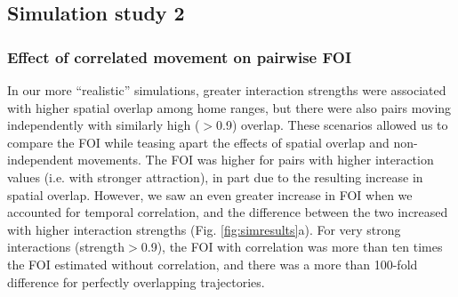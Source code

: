\documentclass[letterpaper]{article}
\begin{document}
\subsection*{Simulation study 2}

\subsubsection*{Effect of correlated movement on pairwise FOI}

In our more ``realistic'' simulations, greater interaction strengths were associated with higher spatial overlap among home ranges, but there were also pairs moving independently with similarly high  ($>$0.9) overlap. 
These scenarios allowed us to compare the FOI while teasing apart the effects of spatial overlap and non-independent movements. 
The FOI was higher for pairs with higher interaction values (i.e. with stronger attraction), in part due to the resulting increase in spatial overlap. 
However, we saw an even greater increase in FOI when we accounted for temporal correlation, and the difference between the two increased with higher interaction strengths (Fig. \ref{fig:simresults}a). For very strong interactions (strength$>$0.9), the FOI with correlation was more than ten times the FOI estimated without correlation, and there was a more than 100-fold difference for perfectly overlapping trajectories.  

\end{document}
